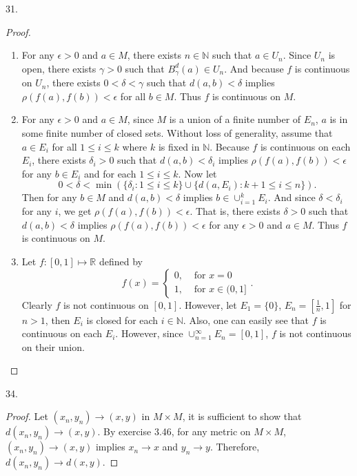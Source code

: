 \documentclass[12pt, a4paper]{article}
\theoremstyle{plain}
\newcommand{\N}{\mathbb{N}}
\newcommand{\R}{\mathbb{R}}
\begin{document}
\pagebreak

31.
\begin{proof}
\hfill
\begin{enumerate}[label=(\roman*)]
\item For any $\epsilon>0$ and $a\in M$, there exists $n\in \N$ such that $a\in U_n$. Since $U_n$ is open, there exists $\gamma>0$ such that $B_\gamma^d(a)\in U_n$. And because $f$ is continuous on $U_n$, there exists $0<\delta<\gamma$ such that $d(a,b)<\delta$ implies $\rho(f(a),f(b))<\epsilon$ for all $b\in M$. Thus $f$ is continuous on $M$.

\item For any $\epsilon>0$ and $a\in M$, since $M$ is a union of a finite number of $E_n$, $a$ is in some finite number of closed sets. Without loss of generality, assume that $a\in E_i$ for all $1\leq i\leq k$ where $k$ is fixed in $\N$. Because $f$ is continuous on each $E_i$, there exists $\delta_i>0$ such that $d(a,b)<\delta_i$ implies $\rho(f(a),f(b))<\epsilon$ for any $b\in E_i$ and for each $1\leq i\leq k$. Now let 
\[
0<\delta<\min(\{\delta_i:1\leq i\leq k\}\cup \{d(a, E_i):k+1\leq i\leq n\}).
\]
Then for any $b\in M$ and $d(a,b)<\delta$ implies $b\in \cup_{i=1}^{k}E_i$. And since $\delta<\delta_i$ for any $i$, we get $\rho(f(a),f(b))<\epsilon$. That is, there exists $\delta>0$ such that $d(a,b)<\delta$ implies $\rho(f(a),f(b))<\epsilon$ for any $\epsilon>0$ and $a\in M$. Thus $f$ is continuous on $M$.

\item Let $f:[0,1]\mapsto \R$ defined by
\[
f(x)=\left\{\begin{array}{lr}
0, & \text{ for } x=0\\
1, & \text{ for } x\in (0,1]
\end{array}\right. .
\]
Clearly $f$ is not continuous on $[0,1]$. However, let $E_1=\{0\}$, $E_n=[\frac{1}{n},1]$ for $n>1$, then $E_i$ is closed for each $i\in\N$. Also, one can easily see that $f$ is continuous on each $E_i$. However, since $\cup_{n=1}^{\infty}{E_n}=[0,1]$, $f$ is not continuous on their union. 
\end{enumerate}
\end{proof}

34.
\begin{proof}
Let $(x_n,y_n)\rightarrow (x,y)$ in $M\times M$, it is sufficient to show that $d(x_n,y_n)\rightarrow (x,y)$. By exercise 3.46, for any metric on $M\times M$, $(x_n,y_n)\rightarrow (x,y)$ implies $x_n\rightarrow x$ and $y_n\rightarrow y$. Therefore, $d(x_n,y_n)\rightarrow d(x,y)$.
\end{proof}
\end{document}
